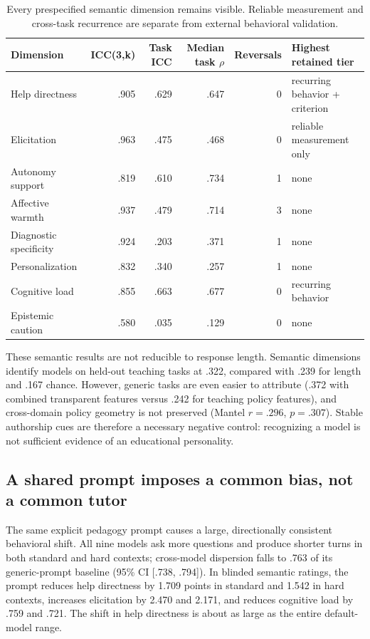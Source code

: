\documentclass[11pt]{article}
\begin{document}
\begin{table}[t]
  \centering
  \small
  \begin{tabular}{lrrrrl}
    \toprule
    \textbf{Dimension} & \textbf{ICC(3,k)} & \textbf{Task ICC} & \textbf{Median task $\rho$} & \textbf{Reversals} & \textbf{Highest retained tier} \\
    \midrule
    Help directness & .905 & .629 & .647 & 0 & recurring behavior + criterion \\
    Elicitation & .963 & .475 & .468 & 0 & reliable measurement only \\
    Autonomy support & .819 & .610 & .734 & 1 & none \\
    Affective warmth & .937 & .479 & .714 & 3 & none \\
    Diagnostic specificity & .924 & .203 & .371 & 1 & none \\
    Personalization & .832 & .340 & .257 & 1 & none \\
    Cognitive load & .855 & .663 & .677 & 0 & recurring behavior \\
    Epistemic caution & .580 & .035 & .129 & 0 & none \\
    \bottomrule
  \end{tabular}
  \caption{Every prespecified semantic dimension remains visible. Reliable
  measurement and cross-task recurrence are separate from external behavioral
  validation.}
  \label{tab:semantic-decisions}
\end{table}

These semantic results are not reducible to response length. Semantic dimensions
identify models on held-out teaching tasks at .322, compared with .239 for length
and .167 chance. However, generic tasks are even easier to attribute (.372 with
combined transparent features versus .242 for teaching policy features), and
cross-domain policy geometry is not preserved (Mantel $r=.296$, $p=.307$).
Stable authorship cues are therefore a necessary negative control: recognizing a
model is not sufficient evidence of an educational personality.

\subsection{A shared prompt imposes a common bias, not a common tutor}

The same explicit pedagogy prompt causes a large, directionally consistent
behavioral shift. All nine models
ask more questions and produce shorter turns in both standard and hard contexts;
cross-model dispersion falls to .763 of its generic-prompt baseline (95\% CI
[.738, .794]). In blinded semantic ratings, the prompt reduces help directness
by 1.709 points in standard and 1.542 in hard contexts, increases elicitation by
2.470 and 2.171, and reduces cognitive load by .759 and .721. The shift in help
directness is about as large as the entire default-model range.
\end{document}
